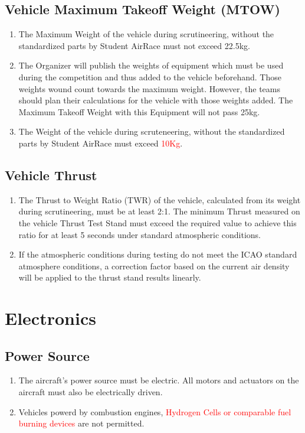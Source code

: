 \documentclass{article}
\begin{document}
\subsection{Vehicle Maximum Takeoff Weight (MTOW)}
\begin{enumerate}
  \item The Maximum Weight of the vehicle during scrutineering, without the standardized parts by Student AirRace must not exceed 22.5kg.
  \item The Organizer will publish the weights of equipment which must be used during the competition and thus added to the vehicle beforehand. Those weights wound count towards the maximum weight. 
  However, the teams should plan their calculations for the vehicle with those weights added. The Maximum Takeoff Weight with this Equipment will not pass 25kg.  
  \item The Weight of the vehicle during scruteneering, without the standardized parts by Student AirRace must exceed \textcolor{red}{10Kg}.  
\end{enumerate}

\subsection{Vehicle Thrust}
\begin{enumerate}
  \item The Thrust to Weight Ratio (TWR) of the vehicle, calculated from its weight during scrutineering, must be at least 2:1. The minimum Thrust measured on the vehicle Thrust Test Stand must exceed the required value to achieve this ratio for at least 5 seconds under standard atmospheric conditions.
  \item If the atmospheric conditions during testing do not meet the ICAO standard atmosphere conditions, a correction factor based on the current air density will be applied to the thrust stand results linearly.
\end{enumerate}


\section{Electronics}


\subsection{Power Source}
\begin{enumerate}
  \item The aircraft's power source must be electric. All motors and actuators on the aircraft must also be electrically driven.
  \item Vehicles powerd by combustion engines, \textcolor{red}{Hydrogen Cells or comparable fuel burning devices} are not permitted. 
\end{enumerate}
\end{document}
